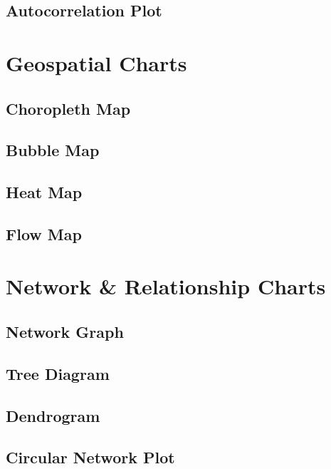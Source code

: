 \documentclass[
  letterpaper,
  DIV=11,
  numbers=noendperiod]{scrreprt}
\begin{document}
\subsection{Autocorrelation Plot}\label{autocorrelation-plot}

\section{Geospatial Charts}\label{geospatial-charts}

\subsection{Choropleth Map}\label{choropleth-map}

\subsection{Bubble Map}\label{bubble-map}

\subsection{Heat Map}\label{heat-map}

\subsection{Flow Map}\label{flow-map}

\section{Network \& Relationship
Charts}\label{network-relationship-charts}

\subsection{Network Graph}\label{network-graph}

\subsection{Tree Diagram}\label{tree-diagram}

\subsection{Dendrogram}\label{dendrogram}

\subsection{Circular Network Plot}\label{circular-network-plot}
\end{document}
